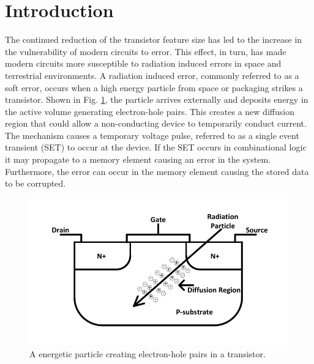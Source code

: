 

\chapter*{Introduction}

The continued reduction of the transistor feature size has led to the increase in the vulnerability of modern circuits to error. This effect, in turn, has made modern circuits more susceptible to radiation induced errors in space and terrestrial environments. A radiation induced error, commonly referred to as a soft error, occurs when a high energy particle from space or packaging strikes a transistor. Shown in Fig. \ref{strike}, the particle arrives externally and deposits energy in the active volume generating electron-hole pairs. This creates a new diffusion region that could allow a non-conducting device to temporarily conduct current. The mechanism causes a temporary voltage pulse, referred to as a single event transient (SET) to occur at the device. If the SET occurs in combinational logic it may propagate to a memory element causing an error in the system. Furthermore, the error can occur in the memory element causing the stored data to be corrupted.

\begin{figure}[!htbp]
	\centering
	\includegraphics[width=0.50\linewidth]{Figures/StrikeFig}
	\caption{A energetic particle creating electron-hole pairs in a transistor.}
	\label{strike}
\end{figure} 

